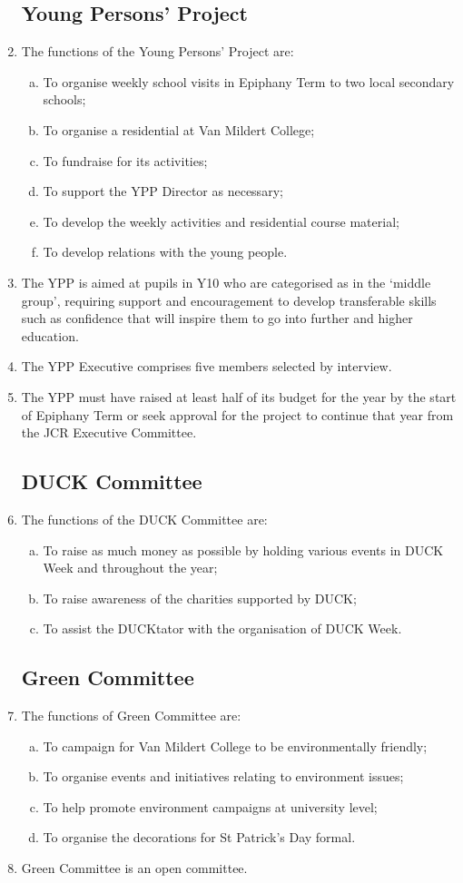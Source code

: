 \documentclass[12pt]{article}  %
\begin{document}
\begin{enumerate}
	\subsection{Young Persons’ Project}
	\item The functions of the Young Persons’ Project are:
	\begin{enumerate}[(a)]
		\item To organise weekly school visits in Epiphany Term to two local secondary schools;
		\item To organise a residential at Van Mildert College;
		\item To fundraise for its activities;
		\item To support the YPP Director as necessary;
		\item To develop the weekly activities and residential course material;
		\item To develop relations with the young people.
	\end{enumerate}
	\item The YPP is aimed at pupils in Y10 who are categorised as in the ‘middle group’, requiring support and encouragement to develop transferable skills such as confidence that will inspire them to go into further and higher education.
	\item The YPP Executive comprises five members selected by interview.
	\item The YPP must have raised at least half of its budget for the year by the start of Epiphany Term or seek approval for the project to continue that year from the JCR Executive Committee.
	\subsection{DUCK Committee}
	\item The functions of the DUCK Committee are:
	\begin{enumerate}[(a)]
		\item To raise as much money as possible by holding various events in DUCK Week and throughout the year;
		\item To raise awareness of the charities supported by DUCK;
		\item To assist the DUCKtator with the organisation of DUCK Week.
	\end{enumerate}
	\subsection{Green Committee}
	\item The functions of Green Committee are:
	\begin{enumerate}[(a)]
		\item To campaign for Van Mildert College to be environmentally friendly;
		\item To organise events and initiatives relating to environment issues;
		\item To help promote environment campaigns at university level;
		\item To organise the decorations for St Patrick’s Day formal.
	\end{enumerate}
	\item Green Committee is an open committee.

\end{enumerate}
\end{document}
